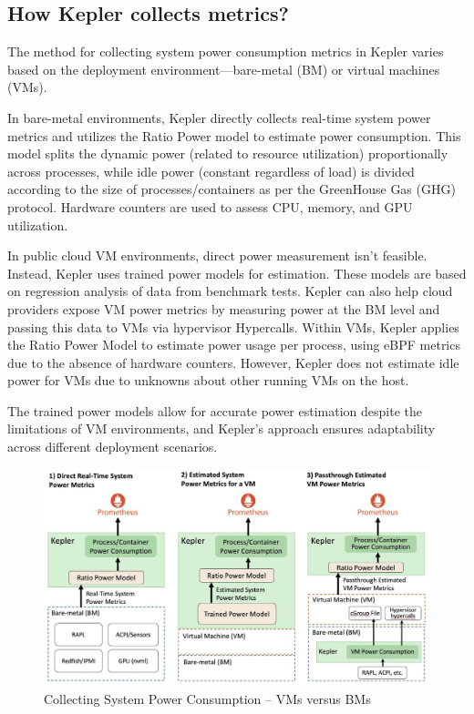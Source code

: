 \subsection{How Kepler collects metrics?}
The method for collecting system power consumption metrics in Kepler varies based on the deployment environment—bare-metal (BM) or virtual machines (VMs).

In bare-metal environments, Kepler directly collects real-time system power metrics and utilizes the Ratio Power model to estimate power consumption. This model splits the dynamic power (related to resource utilization) proportionally across processes, while idle power (constant regardless of load) is divided according to the size of processes/containers as per the GreenHouse Gas (GHG) protocol. Hardware counters are used to assess CPU, memory, and GPU utilization.

In public cloud VM environments, direct power measurement isn't feasible. Instead, Kepler uses trained power models for estimation. These models are based on regression analysis of data from benchmark tests. Kepler can also help cloud providers expose VM power metrics by measuring power at the BM level and passing this data to VMs via hypervisor Hypercalls. Within VMs, Kepler applies the Ratio Power Model to estimate power usage per process, using eBPF metrics due to the absence of hardware counters. However, Kepler does not estimate idle power for VMs due to unknowns about other running VMs on the host.

The trained power models allow for accurate power estimation despite the limitations of VM environments, and Kepler's approach ensures adaptability across different deployment scenarios.


\begin{figure}[H]
  \centering
  \includegraphics[width=16cm]{Figures/kepler-system-power-consumption.jpg}
  \caption{Collecting System Power Consumption – VMs versus BMs}
\end{figure}

